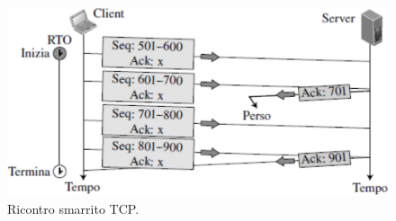 \begin{figure}[h]
    \centering
    \includegraphics[scale=0.28]{Immagini/TCPRiscontroSmarrito.png}
    \caption{Ricontro smarrito TCP.}
\end{figure}

\newblock\\\\\\\\\\\\\\\\\\\\\\\\\\\\\\\\\\\\\\\\\\
